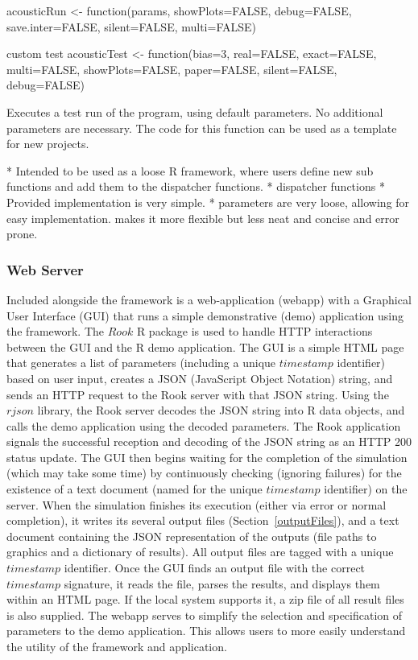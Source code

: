 acousticRun <- function(params, showPlots=FALSE, debug=FALSE, save.inter=FALSE, silent=FALSE, multi=FALSE) {

custom test
acousticTest <- function(bias=3, real=FALSE, exact=FALSE, multi=FALSE, showPlots=FALSE, paper=FALSE, silent=FALSE, debug=FALSE) {
	Executes a test run of the program, using default parameters.  No additional 
	parameters are necessary. The code for this function can be used as a template for new projects.


* Intended to be used as a loose R framework, where users define new sub functions and add them to the dispatcher functions.
* dispatcher functions
* Provided implementation is very simple.
* parameters are very loose, allowing for easy implementation. makes it more flexible but less neat and concise and error prone.

\subsubsection{Web Server}
\label{webServer}
Included alongside the framework is a web-application (webapp) with a Graphical User Interface (GUI) that runs a simple demonstrative (demo) application using the framework.  The $Rook$ R package is used to handle HTTP interactions between the GUI and the R demo application.  The GUI is a simple HTML page that generates a list of parameters (including a unique $timestamp$ identifier) based on user input, creates a JSON (JavaScript Object Notation) string, and sends an HTTP request to the Rook server with that JSON string.  Using the $rjson$ library, the Rook server decodes the JSON string into R data objects, and calls the demo application using the decoded parameters.  The Rook application signals the successful reception and decoding of the JSON string as an HTTP 200 status update.  The GUI then begins waiting for the completion of the simulation (which may take some time) by continuously checking (ignoring failures) for the existence of a text document (named for the unique $timestamp$ identifier) on the server.  When the simulation finishes its execution (either via error or normal completion), it writes its several output files (Section~\ref{outputFiles}), and a text document containing the JSON representation of the outputs (file paths to graphics and a dictionary of results).  All output files are tagged with a unique $timestamp$ identifier.  Once the GUI finds an output file with the correct $timestamp$ signature, it reads the file, parses the results, and displays them within an HTML page.  If the local system supports it, a zip file of all result files is also supplied.  The webapp serves to simplify the selection and specification of parameters to the demo application.  This allows users to more easily understand the utility of the framework and application.

}}
